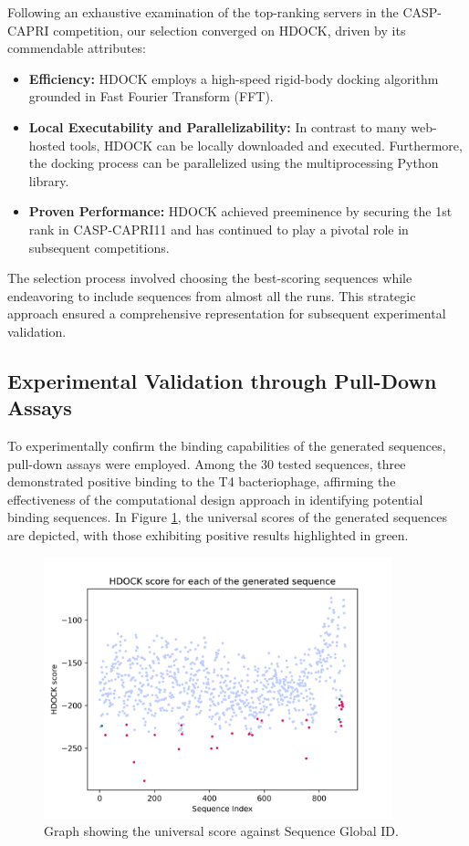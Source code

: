 \documentclass[11pt,a4paper]{article}
\begin{document}
Following an exhaustive examination of the top-ranking servers in the CASP-CAPRI competition, our selection converged on HDOCK, driven by its commendable attributes:

\begin{itemize}
    \item \textbf{Efficiency:} HDOCK employs a high-speed rigid-body docking algorithm grounded in Fast Fourier Transform (FFT).
    \item \textbf{Local Executability and Parallelizability:} In contrast to many web-hosted tools, HDOCK can be locally downloaded and executed. Furthermore, the docking process can be parallelized using the multiprocessing Python library.
    \item \textbf{Proven Performance:} HDOCK achieved preeminence by securing the 1st rank in CASP-CAPRI11 and has continued to play a pivotal role in subsequent competitions.
\end{itemize}

The selection process involved choosing the best-scoring sequences while endeavoring to include sequences from almost all the runs. This strategic approach ensured a comprehensive representation for subsequent experimental validation.

\subsection{Experimental Validation through Pull-Down Assays}

To experimentally confirm the binding capabilities of the generated sequences, pull-down assays were employed. Among the 30 tested sequences, three demonstrated positive binding to the T4 bacteriophage, affirming the effectiveness of the computational design approach in identifying potential binding sequences. In Figure \ref{fig:universal_score}, the universal scores of the generated sequences are depicted, with those exhibiting positive results highlighted in green.

\begin{figure}[ht]
    \centering
    \includegraphics[width=0.9\textwidth]{Figures/universal_score_against_Sequence_Global_ID.png}
    \caption{Graph showing the universal score against Sequence Global ID.}
    \label{fig:universal_score}
\end{figure}
\end{document}
